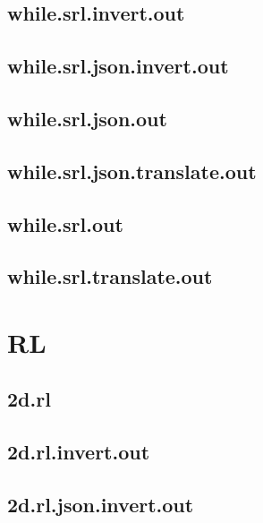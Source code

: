 \subsection{while.srl.invert.out}
\label{app:while_srl.invert.out}

\subsection{while.srl.json.invert.out}
\label{app:while_srl.json.invert.out}

\subsection{while.srl.json.out}
\label{app:while_srl.json.out}

\subsection{while.srl.json.translate.out}
\label{app:while_srl.json.translate.out}

\subsection{while.srl.out}
\label{app:while_srl.out}

\subsection{while.srl.translate.out}
\label{app:while_srl.translate.out}

\section{RL}
\label{app:testing_rl}
\subsection{2d.rl}
\label{app:2d_rl}

\subsection{2d.rl.invert.out}
\label{app:2d_rl.invert.out}

\subsection{2d.rl.json.invert.out}
\label{app:2d_rl.json.invert.out}

